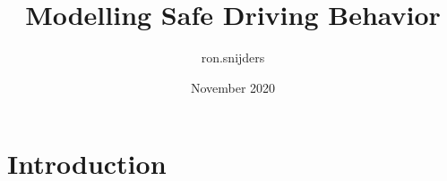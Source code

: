 \documentclass{article}
\title{Modelling Safe Driving Behavior}
\author{ron.snijders }
\date{November 2020}
\begin{document}
\maketitle

\section{Introduction}
\end{document}
